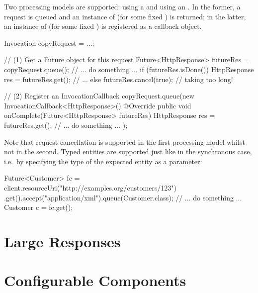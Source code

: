 Two processing models are supported: using a  and using an . In the former, a request is queued and an instance of  (for some fixed ) is returned; in the latter, an instance of  (for some fixed ) is registered as a callback object.

\begin{listing}{1}
Invocation copyRequest = ...;

// (1) Get a Future object for this request
Future<HttpResponse> futureRes = copyRequest.queue();
// ... do something ...
if (futureRes.isDone()) {
    HttpResponse res = futureRes.get();
    // ...
} else {
    futureRes.cancel(true);        // taking too long!
}

// (2) Register an InvocationCallback
copyRequest.queue(new InvocationCallback<HttpResponse>() {
    @Override
    public void onComplete(Future<HttpResponse> futureRes) { 
        HttpResponse res = futureRes.get();
        // ... do something ... 
    }
});
\end{listing}

Note that request cancellation is supported in the first processing model whilst not in the second. Typed entities are supported just like in the synchronous case, i.e.~by specifying the type of the expected entity as a parameter:

\begin{listing}{1}
Future<Customer> fc = client.resourceUri("http://examples.org/customers/123")
    .get().accept("application/xml").queue(Customer.class);
// ... do something ...
Customer c = fc.get();
\end{listing}


\section{Large Responses}

\section{Configurable Components}












